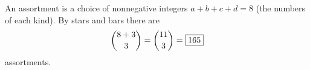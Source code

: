 An assortment is a choice of nonnegative integers $a+b+c+d=8$ (the numbers of each kind). By stars and bars there are
\[
\dbinom{8+3}{3}=\dbinom{11}{3}=\boxed{165}
\]
assortments.
